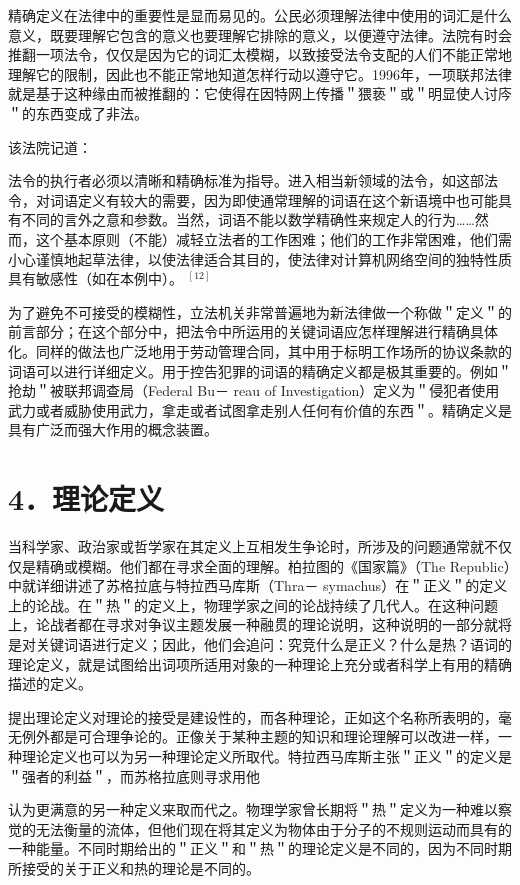 精确定义在法律中的重要性是显而易见的。公民必须理解法律中使用的词汇是什么意义，既要理解它包含的意义也要理解它排除的意义，以便遵守法律。法院有时会推翻一项法令，仅仅是因为它的词汇太模糊，以致接受法令支配的人们不能正常地理解它的限制，因此也不能正常地知道怎样行动以遵守它。1996年，一项联邦法律就是基于这种缘由而被推翻的：它使得在因特网上传播＂猥亵＂或＂明显使人讨庈＂的东西变成了非法。

该法院记道：

法令的执行者必须以清晰和精确标准为指导。进入相当新领域的法令，如这部法令，对词语定义有较大的需要，因为即使通常理解的词语在这个新语境中也可能具有不同的言外之意和参数。当然，词语不能以数学精确性来规定人的行为……然而，这个基本原则（不能）减轻立法者的工作困难；他们的工作非常困难，他们需小心谨慎地起草法律，以使法律适合其目的，使法律对计算机网络空间的独特性质具有敏感性（如在本例中）。 ${ }^{[12]}$

为了避免不可接受的模糊性，立法机关非常普遍地为新法律做一个称做＂定义＂的前言部分；在这个部分中，把法令中所运用的关键词语应怎样理解进行精确具体化。同样的做法也广泛地用于劳动管理合同，其中用于标明工作场所的协议条款的词语可以进行详细定义。用于控告犯罪的词语的精确定义都是极其重要的。例如＂抢劫＂被联邦调查局（Federal Bu－ reau of Investigation）定义为＂侵犯者使用武力或者威胁使用武力，拿走或者试图拿走别人任何有价值的东西＂。精确定义是具有广泛而强大作用的概念装置。

\section*{4．理论定义}
当科学家、政治家或哲学家在其定义上互相发生争论时，所涉及的问题通常就不仅仅是精确或模糊。他们都在寻求全面的理解。柏拉图的《国家篇》（The Republic）中就详细讲述了苏格拉底与特拉西马库斯（Thra－ symachus）在＂正义＂的定义上的论战。在＂热＂的定义上，物理学家之间的论战持续了几代人。在这种问题上，论战者都在寻求对争议主题发展一种融贯的理论说明，这种说明的一部分就将是对关键词语进行定义；因此，他们会追问：究竞什么是正义？什么是热？语词的理论定义，就是试图给出词项所适用对象的一种理论上充分或者科学上有用的精确描述的定义。

提出理论定义对理论的接受是建设性的，而各种理论，正如这个名称所表明的，毫无例外都是可合理争论的。正像关于某种主题的知识和理论理解可以改进一样，一种理论定义也可以为另一种理论定义所取代。特拉西马库斯主张＂正义＂的定义是＂强者的利益＂，而苏格拉底则寻求用他

认为更满意的另一种定义来取而代之。物理学家曾长期将＂热＂定义为一种难以察觉的无法衡量的流体，但他们现在将其定义为物体由于分子的不规则运动而具有的一种能量。不同时期给出的＂正义＂和＂热＂的理论定义是不同的，因为不同时期所接受的关于正义和热的理论是不同的。

